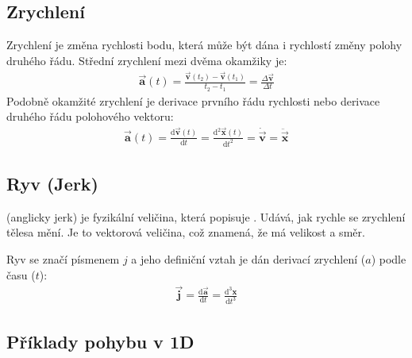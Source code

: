 \documentclass[letterpaper,10pt,english]{jupyterBook}
\begin{document}
\subsection{Zrychlení}
\label{\detokenize{Prednasky/1_2_Kinematika_v_1D:zrychleni}}
\sphinxAtStartPar
Zrychlení je změna rychlosti bodu, která může být dána i rychlostí změny polohy druhého řádu. Střední zrychlení mezi dvěma okamžiky je:
\begin{equation*}
\begin{split}\overrightarrow{\mathbf{a}}(t) = \frac{\overrightarrow{\mathbf{v}}(t_2)-\overrightarrow{\mathbf{v}}(t_1)}{t_2-t_1} = \frac{\Delta \overrightarrow{\mathbf{v}}}{\Delta t}\end{split}
\end{equation*}
\sphinxAtStartPar
Podobně okamžité zrychlení je derivace prvního řádu rychlosti nebo derivace druhého řádu polohového vektoru:
\begin{equation*}
\begin{split}\overrightarrow{\mathbf{a}}(t) = \frac{\mathrm{d}\overrightarrow{\mathbf{v}}(t)}{\mathrm{d}t} = \frac{\mathrm{d}^2\overrightarrow{\mathbf{x}}(t)}{\mathrm{d}t^2} = \dot{\vec{\mathbf{v}}} =\ddot{\vec{\mathbf{x}}}\end{split}
\end{equation*}

\subsection{Ryv (Jerk)}
\label{\detokenize{Prednasky/1_2_Kinematika_v_1D:ryv-jerk}}
\sphinxAtStartPar
{} (anglicky jerk) je fyzikální veličina, která popisuje . Udává, jak rychle se zrychlení tělesa mění. Je to vektorová veličina, což znamená, že má velikost a směr.

\sphinxAtStartPar
Ryv se značí písmenem \(j\) a jeho definiční vztah je dán derivací zrychlení (\(a\)) podle času (\(t\)):
\begin{equation*}
\begin{split}
\vec{\mathbf{j}} = \frac{\mathrm{d}\vec{\mathbf{a}}}{\mathrm{d}t} = \frac{\mathrm{d}^3\mathbf{x}}{\mathrm{d}t^3}
\end{split}
\end{equation*}

\subsection{Příklady pohybu v 1D}
\label{\detokenize{Prednasky/1_2_Kinematika_v_1D:priklady-pohybu-v-1d}}
\end{document}
